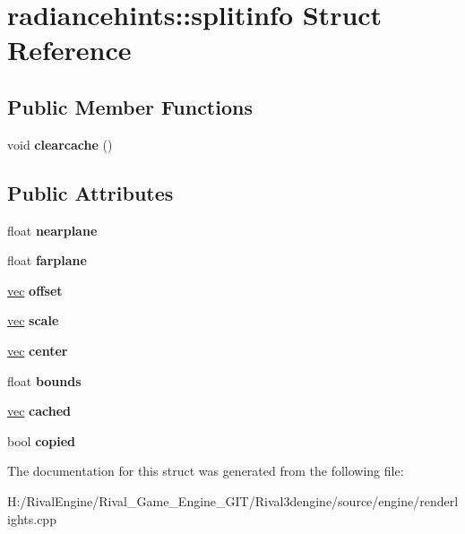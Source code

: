 \hypertarget{structradiancehints_1_1splitinfo}{}\section{radiancehints\+:\+:splitinfo Struct Reference}
\label{structradiancehints_1_1splitinfo}
\subsection*{Public Member Functions}
\begin{DoxyCompactItemize}
\item 
\mbox{\label{structradiancehints_1_1splitinfo_a930c0bbe78ecb68b051f2ac0ca64c7c2}} 
void {\bfseries clearcache} ()
\end{DoxyCompactItemize}
\subsection*{Public Attributes}
\begin{DoxyCompactItemize}
\item 
\mbox{\label{structradiancehints_1_1splitinfo_a2092145f0fdb59f1b1a8c7cd10a50a97}} 
float {\bfseries nearplane}
\item 
\mbox{\label{structradiancehints_1_1splitinfo_ab25a07b538f7988198a8d5c6ac7667bc}} 
float {\bfseries farplane}
\item 
\mbox{\label{structradiancehints_1_1splitinfo_ad0bf72a03e5ac5a39d9c836cc3fdc098}} 
\hyperlink{structvec}{vec} {\bfseries offset}
\item 
\mbox{\label{structradiancehints_1_1splitinfo_aeadabdda70a8bfde0bdcf49fb6f08665}} 
\hyperlink{structvec}{vec} {\bfseries scale}
\item 
\mbox{\label{structradiancehints_1_1splitinfo_ad81c6404a12ae6736b0bd3cb1b880240}} 
\hyperlink{structvec}{vec} {\bfseries center}
\item 
\mbox{\label{structradiancehints_1_1splitinfo_aba1478c17b677db6d6975f04d2927cbd}} 
float {\bfseries bounds}
\item 
\mbox{\label{structradiancehints_1_1splitinfo_a4dd280161e1cbc8813bd501fa9c8e0c2}} 
\hyperlink{structvec}{vec} {\bfseries cached}
\item 
\mbox{\label{structradiancehints_1_1splitinfo_a68a1110a74d790f29507f6c54c3e5aba}} 
bool {\bfseries copied}
\end{DoxyCompactItemize}


The documentation for this struct was generated from the following file\+:\begin{DoxyCompactItemize}
\item 
H\+:/\+Rival\+Engine/\+Rival\+\_\+\+Game\+\_\+\+Engine\+\_\+\+G\+I\+T/\+Rival3dengine/source/engine/renderlights.\+cpp\end{DoxyCompactItemize}
